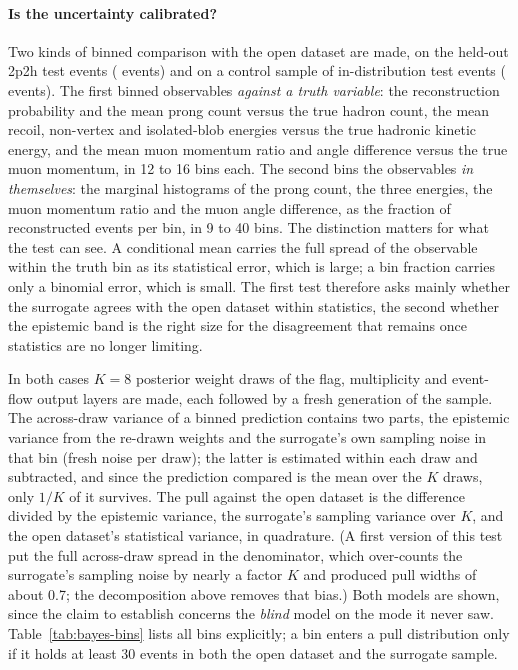 \documentclass[11pt]{article}
\begin{document}
\paragraph{Is the uncertainty calibrated?} Two kinds of binned comparison with the open dataset are made, on
the held-out 2p2h test events (\nBayBnOOD{} events) and on a control sample of in-distribution test events
(\nBayBnCtl{} events). The first binned observables \emph{against a truth variable}: the reconstruction probability and
the mean prong count versus the true hadron count, the mean recoil, non-vertex and isolated-blob energies versus
the true hadronic kinetic energy, and the mean muon momentum ratio and angle difference versus the true muon
momentum, in 12 to 16 bins each. The second bins the observables \emph{in themselves}: the marginal histograms of
the prong count, the three energies, the muon momentum ratio and the muon angle difference, as the fraction of
reconstructed events per bin, in 9 to 40 bins. The distinction matters for what the test can see. A conditional
mean carries the full spread of the observable within the truth bin as its statistical error, which is large; a
bin fraction carries only a binomial error, which is small. The first test therefore asks mainly whether the
surrogate agrees with the open dataset within statistics, the second whether the epistemic band is the right
size for the disagreement that remains once statistics are no longer limiting.

In both cases $K=8$ posterior weight draws of the flag, multiplicity and event-flow output layers are made, each
followed by a fresh generation of the sample. The across-draw variance of a binned prediction contains two parts,
the epistemic variance from the re-drawn weights and the surrogate's own sampling noise in that bin (fresh noise
per draw); the latter is estimated within each draw and subtracted, and since the prediction compared is the mean
over the $K$ draws, only $1/K$ of it survives. The pull against the open dataset is the difference divided by the
epistemic variance, the surrogate's sampling variance over $K$, and the open dataset's statistical variance, in
quadrature. (A first version of this test put the full across-draw spread in the denominator, which over-counts
the surrogate's sampling noise by nearly a factor $K$ and produced pull widths of about 0.7; the decomposition
above removes that bias.) Both models are shown, since the claim to establish concerns the \emph{blind} model on
the mode it never saw. Table~\ref{tab:bayes-bins} lists all bins explicitly; a bin enters a pull distribution only
if it holds at least 30 events in both the open dataset and the surrogate sample.
\end{document}
